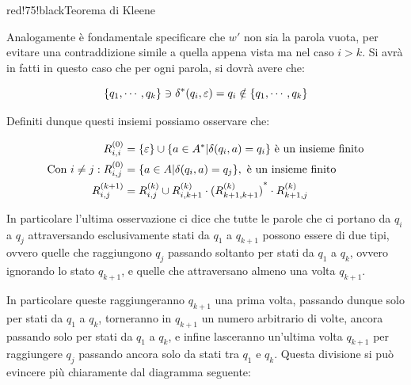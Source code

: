 \begin{halfframedbox}{red!75!black}{Teorema di Kleene}
\begin{itemize}
    Analogamente è fondamentale specificare che \(w'\) non sia la parola vuota, per evitare una contraddizione simile a quella appena vista ma nel caso \(i>k\). Si avrà in fatti in questo caso che per ogni parola, si dovrà avere che:

    \begin{equation}
      \displaystyle{\left\{{q_1, \cdots, q_k}\right\}} \ni \delta^*(q_i,\varepsilon) = q_i \notin \displaystyle{\left\{{q_1, \cdots, q_k}\right\}}
    \end{equation}

    Definiti dunque questi insiemi possiamo osservare che:

    \begin{equation}
      \begin{split}
        R^{(0)}_{i,i}&=\displaystyle{\left\{{\varepsilon}\right\}} \cup \displaystyle{\left\{{a \in A^* \vert \delta(q_i, a) = q_i}\right\}} \text{ è un insieme finito}\\
        \text{Con } i \neq j: R^{(0)}_{i,j}&=\displaystyle{\left\{{a \in A \vert \delta(q_i, a) = q_j}\right\}}, \text{ è un insieme finito} \\
        R^{(k+1)}_{i,j}&=R^{(k)}_{i,j} \cup R^{(k)}_{i,k+1}\cdot {(R^{(k)}_{k+1,k+1})}^* \cdot R^{(k)}_{k+1,j}
      \end{split}
    \end{equation}


  In particolare l'ultima osservazione ci dice che tutte le parole che ci portano da \(q_i\) a \(q_j\) attraversando esclusivamente stati da \(q_1\) a \(q_{k+1}\) possono essere di due tipi, ovvero quelle che raggiungono \(q_j\) passando soltanto per stati da \(q_1\) a \(q_k\), ovvero ignorando lo stato \(q_{k+1}\), e quelle che attraversano almeno una volta \(q_{k+1}\).

  In particolare queste raggiungeranno \(q_{k+1}\) una prima volta, passando dunque solo per stati da \(q_1\) a \(q_k\), torneranno in \(q_{k+1}\) un numero arbitrario di volte, ancora passando solo per stati da \(q_1\) a \(q_k\), e infine lasceranno un'ultima volta \(q_{k+1}\) per raggiungere \(q_j\) passando ancora solo da stati tra \(q_1\) e \(q_k\). Questa divisione si può evincere più chiaramente dal diagramma seguente:

  \medskip
  \begin{center}
\end{center}
\end{itemize}
\end{halfframedbox}
